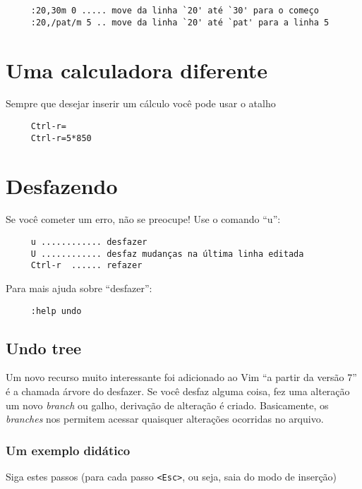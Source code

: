 \begin{verbatim}
     :20,30m 0 ..... move da linha `20' até `30' para o começo
     :20,/pat/m 5 .. move da linha `20' até `pat' para a linha 5
\end{verbatim}


\section{Uma calculadora diferente}
\label{Uma calculadora diferente}
Sempre que desejar inserir um cálculo você pode usar o atalho

\begin{verbatim}
     Ctrl-r=
     Ctrl-r=5*850
\end{verbatim}


\section{Desfazendo}
\label{Desfazendo}

Se você cometer um erro, não se preocupe! Use o comando ``u'':

\begin{verbatim}
     u ............ desfazer
     U ............ desfaz mudanças na última linha editada
     Ctrl-r  ...... refazer
\end{verbatim}

Para mais ajuda sobre ``desfazer'':

\begin{verbatim}
     :help undo
\end{verbatim}

\subsection{Undo tree}
\label{Undo tree}

Um novo recurso muito interessante foi adicionado ao Vim ``a partir da
versão 7''  é a chamada árvore do desfazer.  Se
você desfaz alguma coisa, fez uma alteração um novo {\em branch} ou
galho, derivação de alteração é criado.  Basicamente, os {\em branches}
nos permitem acessar quaisquer alterações ocorridas no arquivo.

\subsubsection{Um exemplo didático}
\label{Um exemplo didático}

Siga estes passos (para cada passo \verb|<Esc>|, ou seja, saia do modo
de inserção)


